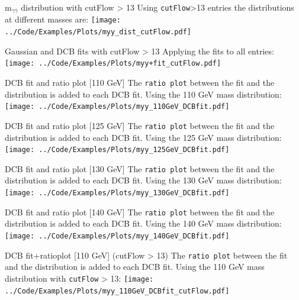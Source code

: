 \documentclass[10pt,UKenglish, leqno, xcolor = dvipsnames]{beamer}
\begin{document}
		\begin{frame}{m$_{\gamma\gamma}$ distribution with cutFlow > 13}
			\vfill
			Using \texttt{cutFlow}>13 entries the distributions at different masses are:
			\texttt{[image: ../Code/Examples/Plots/myy\_dist\_cutFlow.pdf]}
			\vfill
		\end{frame}
	
		\begin{frame}{Gaussian and DCB fits with cutFlow > 13}
			\vfill
			Applying the fits to all entries:
			\texttt{[image: ../Code/Examples/Plots/myy+fit\_cutFlow.pdf]}
			\vfill
		\end{frame}
	
		\begin{frame}{DCB fit and ratio plot [110 GeV]}
			\vfill
			The \texttt{ratio plot} between the fit and the distribution is added to each DCB fit. Using the 110 GeV mass distribution:
			\texttt{[image: ../Code/Examples/Plots/myy\_110GeV\_DCBfit.pdf]}
			\vfill
		\end{frame}
	
		\begin{frame}{DCB fit and ratio plot [125 GeV]}
			\vfill
			The \texttt{ratio plot} between the fit and the distribution is added to each DCB fit. Using the 125 GeV mass distribution:
			\texttt{[image: ../Code/Examples/Plots/myy\_125GeV\_DCBfit.pdf]}
			\vfill
		\end{frame}
	
		\begin{frame}{DCB fit and ratio plot [130 GeV]}
			\vfill
			The \texttt{ratio plot} between the fit and the distribution is added to each DCB fit. Using the 130 GeV mass distribution:
			\texttt{[image: ../Code/Examples/Plots/myy\_130GeV\_DCBfit.pdf]}
			\vfill
		\end{frame}
	
		\begin{frame}{DCB fit and ratio plot [140 GeV]}
			\vfill
			The \texttt{ratio plot} between the fit and the distribution is added to each DCB fit. Using the 140 GeV mass distribution:
			\texttt{[image: ../Code/Examples/Plots/myy\_140GeV\_DCBfit.pdf]}
			\vfill
		\end{frame}
	
		\begin{frame}{DCB fit+ratioplot [110 GeV] (cutFlow > 13)}
			\vfill
			The \texttt{ratio plot} between the fit and the distribution is added to each DCB fit. Using the 110 GeV mass distribution with \texttt{cutFlow} > 13:
			\texttt{[image: ../Code/Examples/Plots/myy\_110GeV\_DCBfit\_cutFlow.pdf]}
			\vfill
		\end{frame}
		
\end{document}
